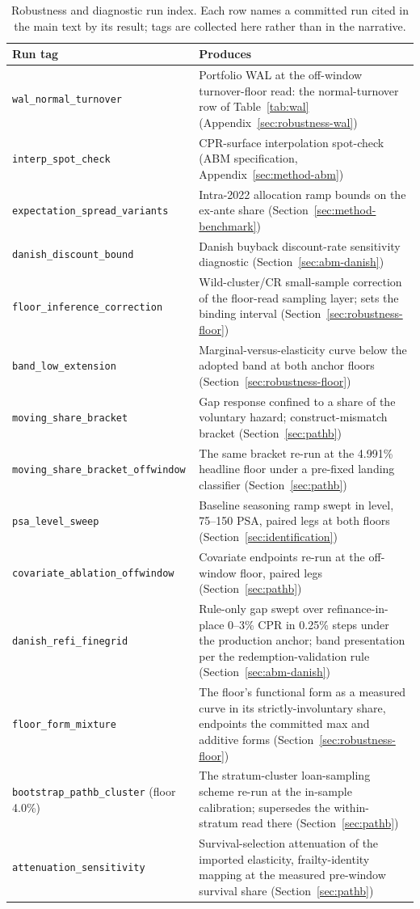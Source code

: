 \documentclass[12pt]{article}
\begin{document}
\begin{table}[H]
\centering
\footnotesize
\begin{threeparttable}
\caption{Robustness and diagnostic run index. Each row names a committed run cited in the main text by its result; tags are collected here rather than in the narrative.}
\label{tab:runindex}
\begin{tabular}{@{}p{5.4cm}p{8.8cm}@{}}
\toprule
Run tag & Produces \\
\midrule
\texttt{wal\_normal\_turnover} & Portfolio WAL at the off-window turnover-floor read: the normal-turnover row of Table~\ref{tab:wal} (Appendix~\ref{sec:robustness-wal}) \\
\texttt{interp\_spot\_check} & CPR-surface interpolation spot-check (ABM specification, Appendix~\ref{sec:method-abm}) \\
\texttt{expectation\_spread\_variants} & Intra-2022 allocation ramp bounds on the ex-ante share (Section~\ref{sec:method-benchmark}) \\
\texttt{danish\_discount\_bound} & Danish buyback discount-rate sensitivity diagnostic (Section~\ref{sec:abm-danish}) \\
\texttt{floor\_inference\_correction} & Wild-cluster/CR small-sample correction of the floor-read sampling layer; sets the binding interval (Section~\ref{sec:robustness-floor}) \\
\texttt{band\_low\_extension} & Marginal-versus-elasticity curve below the adopted band at both anchor floors (Section~\ref{sec:robustness-floor}) \\
\texttt{moving\_share\_bracket} & Gap response confined to a share of the voluntary hazard; construct-mismatch bracket (Section~\ref{sec:pathb}) \\ \texttt{moving\_share\_bracket\_offwindow} & The same bracket re-run at the 4.991\% headline floor under a pre-fixed landing classifier (Section~\ref{sec:pathb}) \\ \texttt{psa\_level\_sweep} & Baseline seasoning ramp swept in level, 75--150 PSA, paired legs at both floors (Section~\ref{sec:identification}) \\ \texttt{covariate\_ablation\_offwindow} & Covariate endpoints re-run at the off-window floor, paired legs (Section~\ref{sec:pathb}) \\ \texttt{danish\_refi\_finegrid} & Rule-only gap swept over refinance-in-place 0--3\% CPR in 0.25\% steps under the production anchor; band presentation per the redemption-validation rule (Section~\ref{sec:abm-danish}) \\ \texttt{floor\_form\_mixture} & The floor's functional form as a measured curve in its strictly-involuntary share, endpoints the committed max and additive forms (Section~\ref{sec:robustness-floor}) \\ \texttt{bootstrap\_pathb\_cluster} (floor 4.0\%) & The stratum-cluster loan-sampling scheme re-run at the in-sample calibration; supersedes the within-stratum read there (Section~\ref{sec:pathb}) \\ \texttt{attenuation\_sensitivity} & Survival-selection attenuation of the imported elasticity, frailty-identity mapping at the measured pre-window survival share (Section~\ref{sec:pathb}) \\

\end{tabular}
\end{threeparttable}
\end{table}
\end{document}
